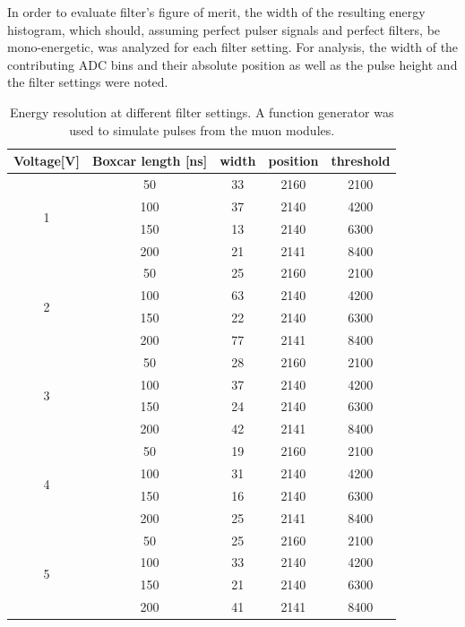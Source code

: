   In order to evaluate filter's figure of merit, the width of the resulting energy histogram, which should, assuming perfect pulser signals and perfect filters, be mono-energetic, was analyzed for each filter setting. For analysis, the width of the contributing ADC bins and their absolute position as well as the pulse height and the filter settings were noted. 
  
  \begin{table}
	\centering
	  \caption[Energy Resolution dependent on Filter Setting]{Energy resolution at different filter settings. A function generator was used to simulate pulses from the muon modules.}
	\centering
  	\begin{tabular}{|c|c|c|c|c|}
  		\hline
  		Voltage[V] & Boxcar length [ns] & width & position & threshold\\
  		\hline
  		\multirow{4}{*}{1} & 50 & 33 & 2160 & 2100\\
  		 & 100 & 37 & 2140 & 4200\\
  		 & 150 & 13 & 2140 & 6300\\
  		 & 200 & 21 & 2141 & 8400\\
  		 \hline
  		 \multirow{4}{*}{2} & 50 & 25 & 2160 & 2100\\
  		 & 100 & 63 & 2140 & 4200\\
  		 & 150 & 22 & 2140 & 6300\\
  		 & 200 & 77 & 2141 & 8400\\
  		 \hline
  		 \multirow{4}{*}{3} & 50 & 28 & 2160 & 2100\\
  		 & 100 & 37 & 2140 & 4200\\
  		 & 150 & 24 & 2140 & 6300\\
  		 & 200 & 42 & 2141 & 8400\\
  		 \hline
  		 \multirow{4}{*}{4} & 50 & 19 & 2160 & 2100\\
  		 & 100 & 31 & 2140 & 4200\\
  		 & 150 & 16 & 2140 & 6300\\
  		 & 200 & 25 & 2141 & 8400\\
  		 \hline
  		 \multirow{4}{*}{5} & 50 & 25 & 2160 & 2100\\
  		 & 100 & 33 & 2140 & 4200\\
  		 & 150 & 21 & 2140 & 6300\\
  		 & 200 & 41 & 2141 & 8400\\
  		 \hline	
  	\end{tabular}
  \end{table}
  
